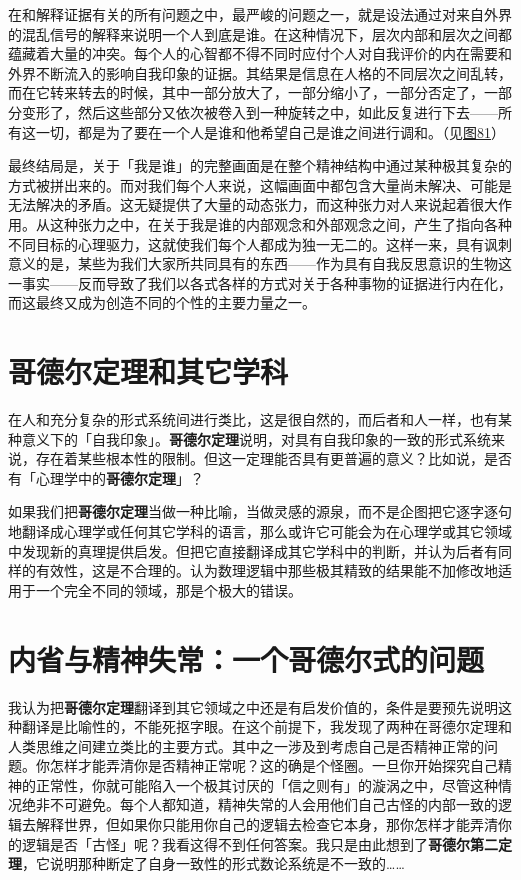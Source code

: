 \documentclass[
  12pt,
  twoside,
  openright,
  oldfontcommands,
]{memoir}
\newcommand{\heititext}[1]{{\heifamily\bfseries #1}}
\begin{document}
在和解释证据有关的所有问题之中，最严峻的问题之一，就是设法通过对来自外界的混乱信号的解释来说明一个人到底是谁。在这种情况下，层次内部和层次之间都蕴藏着大量的冲突。每个人的心智都不得不同时应付个人对自我评价的内在需要和外界不断流入的影响自我印象的证据。其结果是信息在人格的不同层次之间乱转，而在它转来转去的时候，其中一部分放大了，一部分缩小了，一部分否定了，一部分变形了，然后这些部分又依次被卷入到一种旋转之中，如此反复进行下去------所有这一切，都是为了要在一个人是谁和他希望自己是谁之间进行调和。（见\hyperref[fig:81]{图81}）

最终结局是，关于「我是谁」的完整画面是在整个精神结构中通过某种极其复杂的方式被拼出来的。而对我们每个人来说，这幅画面中都包含大量尚未解决、可能是无法解决的矛盾。这无疑提供了大量的动态张力，而这种张力对人来说起着很大作用。从这种张力之中，在关于我是谁的内部观念和外部观念之间，产生了指向各种不同目标的心理驱力，这就使我们每个人都成为独一无二的。这样一来，具有讽刺意义的是，某些为我们大家所共同具有的东西------作为具有自我反思意识的生物这一事实------反而导致了我们以各式各样的方式对关于各种事物的证据进行内在化，而这最终又成为创造不同的个性的主要力量之一。

\section{哥德尔定理和其它学科}

在人和充分复杂的形式系统间进行类比，这是很自然的，而后者和人一样，也有某种意义下的「自我印象」。\heititext{哥德尔定理}说明，对具有自我印象的一致的形式系统来说，存在着某些根本性的限制。但这一定理能否具有更普遍的意义？比如说，是否有「心理学中的\heititext{哥德尔定理}」？

如果我们把\heititext{哥德尔定理}当做一种比喻，当做灵感的源泉，而不是企图把它逐字逐句地翻译成心理学或任何其它学科的语言，那么或许它可能会为在心理学或其它领域中发现新的真理提供启发。但把它直接翻译成其它学科中的判断，并认为后者有同样的有效性，这是不合理的。认为数理逻辑中那些极其精致的结果能不加修改地适用于一个完全不同的领域，那是个极大的错误。

\section{内省与精神失常：一个哥德尔式的问题}

我认为把\heititext{哥德尔定理}翻译到其它领域之中还是有启发价值的，条件是要预先说明这种翻译是比喻性的，不能死抠字眼。在这个前提下，我发现了两种在哥德尔定理和人类思维之间建立类比的主要方式。其中之一涉及到考虑自己是否精神正常的问题。你怎样才能弄清你是否精神正常呢？这的确是个怪圈。一旦你开始探究自己精神的正常性，你就可能陷入一个极其讨厌的「信之则有」的漩涡之中，尽管这种情况绝非不可避免。每个人都知道，精神失常的人会用他们自己古怪的内部一致的逻辑去解释世界，但如果你只能用你自己的逻辑去检查它本身，那你怎样才能弄清你的逻辑是否「古怪」呢？我看这得不到任何答案。我只是由此想到了\heititext{哥德尔第二定理}，它说明那种断定了自身一致性的形式数论系统是不一致的\ldots\ldots{}
\end{document}
